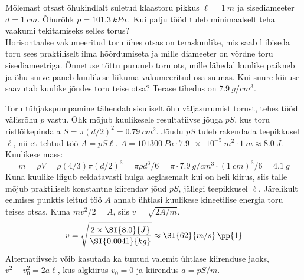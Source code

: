 \setAuthor{}

Mõlemast otsast õhukindlalt suletud klaastoru pikkus $\ell=\SI{1}{m}$ ja sisediameeter $d=\SI{1}{cm}$. Õhurõhk $p=\SI{101.3}{kPa}$.\
\osa Kui palju tööd tuleb minimaalselt teha vaakumi tekitamiseks selles torus?\\
\osa Horisontaalse vakumeeritud toru ühes otsas on teraskuulike, mis saab l	ibiseda toru sees praktiliselt ilma hõõrdumiseta ja mille diameeter on võrdne toru sisediameetriga. Õnnetuse tõttu puruneb toru ots, mille lähedal kuulike paikneb  ja õhu surve paneb kuulikese liikuma vakumeeritud osa suunas. Kui suure kiiruse saavutab kuulike jõudes toru teise otsa? Terase tihedus on $\SI{7.9}{g/cm^3}$.






\hint

\solu
\osa Toru tühjakspumpamine tähendab sisuliselt õhu väljasurumist torust, tehes tööd välisrõhu $p$ vastu.  Õhk mõjub kuulikesele resultatiivse jõuga $pS$, kus toru ristlõikepindala $S=\pi(d/2)^2=\SI{0.79}{cm^2}$.  Jõudu $pS$ tuleb rakendada teepikkusel $\ell$, nii et tehtud töö $A=pS\ell$.    $A=\SI{101300}{Pa}\cdot \SI{7.9e-5}{m^2}\cdot\SI{1}{m}\approx\SI{8.0}{J}$. \\
\osa Kuulikese mass: \[m=\rho V=\rho(4/3)\pi(d/2)^3=\pi \rho d^3/6= \pi\cdot \SI{7.9}{g/cm^3}\cdot (\SI{1}{cm})^3/6 =\SI{4.1}{g}\]  Kuna kuulike liigub eeldatavasti hulga aeglasemalt kui on heli kiirus, siis talle mõjub praktiliselt konstantne kiirendav jõud $pS$, jällegi teepikkusel $\ell$. Järelikult eelmises punktis leitud töö $A$ annab ühtlasi kuulikese kineetilise energia toru teises otsas.  Kuna $mv^2/2=A$, siis $v=\sqrt{2A/m}$. \pp{1}
\[
v=\sqrt{\frac{2\times \SI{8.0}{J}}{\SI{0.0041}{kg}}}\approx\SI{62}{m/s}\,\text{\pp{1}}
\]
Alternatiivselt võib kasutada ka tuntud valemit ühtlase kiirenduse jaoks, $v^2-v_0^2=2a\ell$, kus algkiirus $v_0=0$ ja kiirendus $a=pS/m$.
\probend